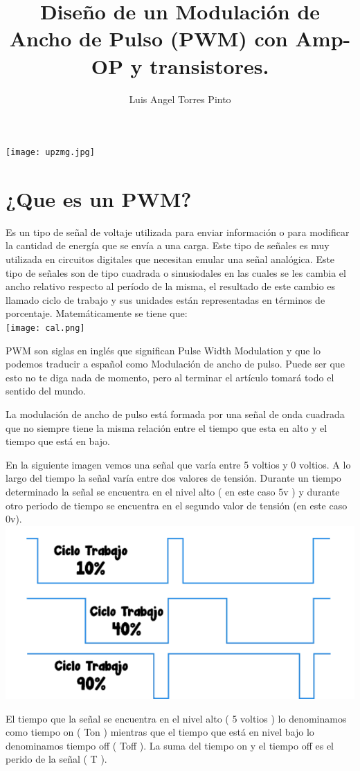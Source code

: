 \documentclass[10pt,a4paper]{article}
\author{Luis Angel Torres Pinto}
\title{Diseño de un Modulación de Ancho de Pulso (PWM) con Amp-OP y transistores.}
\begin{document}
\maketitle
\centering
\texttt{[image: upzmg.jpg]}\\
\newpage 
\raggedright
\section{¿Que es un PWM?}
Es un tipo de señal de voltaje utilizada para enviar información o para modificar la cantidad de energía que se envía a una carga. Este tipo de señales es muy utilizada en circuitos digitales que necesitan emular una señal analógica.
Este tipo de señales son de tipo cuadrada o sinusiodales en las cuales se les cambia el ancho relativo respecto al período de la misma, el resultado de este cambio es llamado ciclo de trabajo y sus unidades están representadas en términos de porcentaje. Matemáticamente se tiene que:\\
\centering
\texttt{[image: cal.png]}\\ 
\raggedright
PWM son siglas en inglés que significan Pulse Width Modulation y que lo podemos traducir a español como Modulación de ancho de pulso. Puede ser que esto no te diga nada de momento, pero al terminar el artículo tomará todo el sentido del mundo.

La modulación de ancho de pulso está formada por una señal de onda cuadrada que no siempre tiene la misma relación entre el tiempo que esta en alto y el tiempo que está en bajo.

En la siguiente imagen vemos una señal que varía entre 5 voltios y 0 voltios. A lo largo del tiempo la señal varía entre dos valores de tensión. Durante un tiempo determinado la señal se encuentra en el nivel alto ( en este caso 5v ) y durante otro periodo de tiempo se encuentra en el segundo valor de tensión (en este caso 0v).\\
\centering
\includegraphics[scale=.80]{señ.png}\\
\raggedright
El tiempo que la señal se encuentra en el nivel alto ( 5 voltios ) lo denominamos como tiempo on ( Ton ) mientras que el tiempo que está en nivel bajo lo denominamos tiempo off ( Toff ). La suma del tiempo on y el tiempo off es el perido de la señal ( T ).
\end{document}
